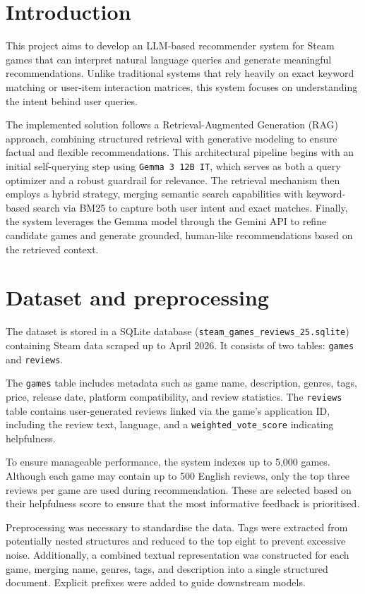\section{Introduction}
This project aims to develop an LLM-based recommender system for Steam games that can interpret natural language queries and generate meaningful recommendations. Unlike traditional systems that rely heavily on exact keyword matching or user-item interaction matrices, this system focuses on understanding the intent behind user queries.

The implemented solution follows a Retrieval-Augmented Generation (RAG) approach, combining structured retrieval with generative modeling to ensure factual and flexible recommendations. This architectural pipeline begins with an initial self-querying step using \texttt{Gemma 3 12B IT}, which serves as both a query optimizer and a robust guardrail for relevance. The retrieval mechanism then employs a hybrid strategy, merging semantic search capabilities with keyword-based search via BM25 to capture both user intent and exact matches. Finally, the system leverages the Gemma model through the Gemini API to refine candidate games and generate grounded, human-like recommendations based on the retrieved context.


\section{Dataset and preprocessing}
The dataset is stored in a SQLite database (\texttt{steam\_games\_reviews\_25.sqlite}) containing Steam data scraped up to April 2026. It consists of two tables: \texttt{games} and \texttt{reviews}.

The \texttt{games} table includes metadata such as game name, description, genres, tags, price, release date, platform compatibility, and review statistics. The \texttt{reviews} table contains user-generated reviews linked via the game’s application ID, including the review text, language, and a \texttt{weighted\_vote\_score} indicating helpfulness.

To ensure manageable performance, the system indexes up to 5,000 games. Although each game may contain up to 500 English reviews, only the top three reviews per game are used during recommendation. These are selected based on their helpfulness score to ensure that the most informative feedback is prioritised.

Preprocessing was necessary to standardise the data. Tags were extracted from potentially nested structures and reduced to the top eight to prevent excessive noise. Additionally, a combined textual representation was constructed for each game, merging name, genres, tags, and description into a single structured document. Explicit prefixes were added to guide downstream models.

